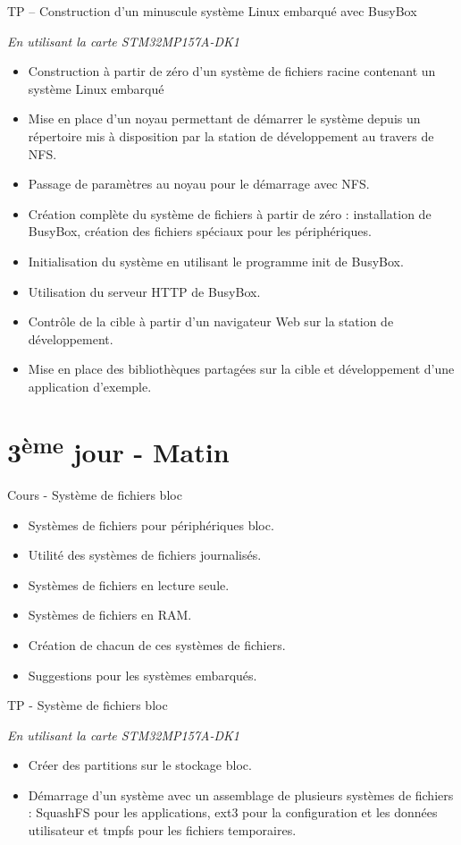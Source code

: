 \documentclass[a4paper,12pt,obeyspaces,spaces,hyphens]{article}
\begin{document}
\feagendaonecolumn
{TP – Construction d'un minuscule système Linux embarqué avec BusyBox}
{
  {\em En utilisant la carte STM32MP157A-DK1}
  \begin{itemize}
  \item Construction à partir de zéro d'un système de fichiers racine
	contenant un système Linux embarqué
  \item Mise en place d'un noyau permettant de démarrer le système
	depuis un répertoire mis à disposition par la station de
	développement au travers de NFS.
  \item Passage de paramètres au noyau pour le démarrage avec NFS.
  \item Création complète du système de fichiers à partir de zéro :
	installation de BusyBox, création des fichiers spéciaux
	pour les périphériques.
  \item Initialisation du système en utilisant le programme init de BusyBox.
  \item Utilisation du serveur HTTP de BusyBox.
  \item Contrôle de la cible à partir d'un navigateur Web sur la
	station de développement.
  \item Mise en place des bibliothèques partagées sur la cible et
	développement d'une application d'exemple.
  \end{itemize}
}

\section{3\textsuperscript{ème} jour - Matin}

\feagendatwocolumn
{Cours - Système de fichiers bloc}
{
  \begin{itemize}
  \item Systèmes de fichiers pour périphériques bloc.
  \item Utilité des systèmes de fichiers journalisés.
  \item Systèmes de fichiers en lecture seule.
  \item Systèmes de fichiers en RAM.
  \item Création de chacun de ces systèmes de fichiers.
  \item Suggestions pour les systèmes embarqués.
  \end{itemize}
}
{TP - Système de fichiers bloc}
{
  {\em En utilisant la carte STM32MP157A-DK1}
  \begin{itemize}
  \item Créer des partitions sur le stockage bloc.
  \item Démarrage d'un système avec un assemblage de plusieurs systèmes
	de fichiers : SquashFS pour les applications, ext3 pour la
 	configuration et les données utilisateur et tmpfs pour les
	fichiers temporaires.
  \end{itemize}
}
\end{document}
